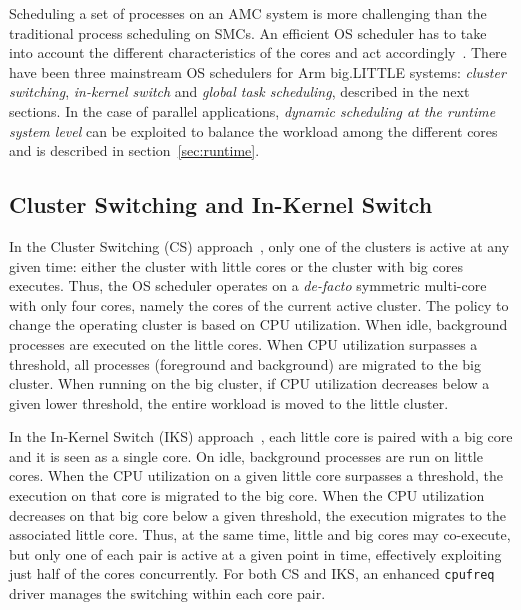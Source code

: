 Scheduling a set of processes on an AMC system is more challenging than the traditional process scheduling on SMCs. 
An efficient OS scheduler has to take into account the different characteristics of the cores and act accordingly~\cite{coolingAware}.
There have been three mainstream OS schedulers for Arm big.LITTLE systems: \textit{cluster switching}, 
\textit{in-kernel switch} and \textit{global task scheduling}, described in the next sections.
In the case of parallel applications, \textit{dynamic scheduling at the runtime system level} can be exploited to balance the workload among the different cores and is described in section~\ref{sec:runtime}.


\subsection{Cluster Switching and In-Kernel Switch}
In the Cluster Switching (CS) approach~\cite{samsung}, only one of the clusters is active at any given time: either the cluster with little cores or the cluster with big cores executes. Thus, the OS scheduler operates on a \emph{de-facto} symmetric multi-core with only four cores, namely the cores of the current active cluster. The policy to change the operating cluster is based on CPU utilization. When idle, background processes are executed on the little cores. When CPU utilization surpasses a threshold, all processes (foreground and background) are migrated to the big cluster. When running on the big cluster, if CPU utilization decreases below a given lower threshold, the entire workload is moved to the little cluster. 

In the In-Kernel Switch (IKS) approach~\cite{IKS}, each little core is paired with a big core and it is seen as a single core. On idle, background processes are run on little cores. When the CPU utilization on a given little core surpasses a threshold, the execution on that core is migrated to the big core. When the CPU utilization decreases on that big core below a given threshold, the execution migrates to the associated little core. Thus, at the same time, little and big cores may co-execute, but only one of each pair is active at a given point in time, effectively exploiting just half of the cores concurrently. For both CS and IKS, an enhanced \texttt{cpufreq} driver manages the switching within each core pair.

